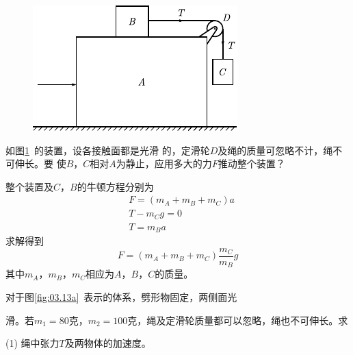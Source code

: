 \begin{figure}
    \centering
    \includegraphics{figure/fig03.12}
    \caption{}
    \label{fig:03.12}
\end{figure}
\example 如图\ref{fig:03.12}~的装置，设各接触面都是光滑
的，定滑轮$ D $及绳的质量可忽略不计，绳不可伸长。要
使$ B $，$ C $相对$ A $为静止，应用多大的力$ F $推动整个装置？

\solution 整个装置及$ C $，$ B $的牛顿方程分别为
\begin{align*}
	&F = \left( m _{A} + m _ { B } + m _ { C } \right) a \\[-0.5em]
	&T - m _ { C } g = 0 \\[-0.5em]
	&T = m _ { B } a
\end{align*}
求解得到\vspace{-1.56em}
\begin{equation*}
	F = \left( m _ { A } + m _ { B } + m _ { C } \right) \frac { m _ { C } } { m _ { B } } g
\end{equation*}
其中$ m_{A} $，$ m_{B} $，$ m_{C} $相应为$ A $，$ B $，$ C $的质量。


\example 对于图\ref{fig:03.13a}~表示的体系，劈形物固定，两侧面光

\noindent 滑。若$  m _ { 1 } = 8 0 \text{克} $，$ m _ { 2 } = 1 0 0 \text{克} $，绳及定滑轮质量都可以忽略，绳也不可伸长。求

(1) 绳中张力$ T $及两物体的加速度。

